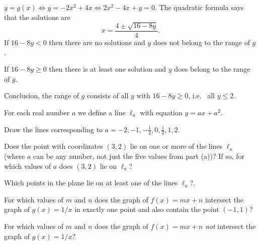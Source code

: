 \begin{multicols}{2}
$y = g(x) \iff y = -2x^2+4x \iff 2x^2-4x+y = 0$.
The quadratic formula says that the solutions are
\[
x= \frac{4\pm\sqrt{16-8y}} {4}.
\]
If $16-8y<0$ then there are no solutions and $y$ does
not belong to the range of $g$.

If $16-8y\geq0$ then there is at least one solution
and  $y$ does belong to the range of $g$.

Conclusion, the range of $g$ consists of all $y$ with
$16-8y\geq 0$, i.e.~ all $y\leq2$.
\endanswer

\problem \groupproblem For each real number $a$ we define a line
$\ell_a$ with equation $y=ax+a^2$.

\subprob Draw the lines corresponding to $a=-2, -1, -\frac12, 0,
\frac12, 1, 2$.

\subprob Does the point with coordinates $(3, 2)$ lie on one or more of
the lines $\ell_a$ (where $a$ can be any number, not just the five
values from part (a))?  If so, for which values of $a$ does $(3,2)$ lie on
$\ell_a$?

\subprob Which points in the plane lie on at least one of the lines
$\ell_a$?.


\problem For which values of $m$ and $n$ does the graph of $f(x) = mx+n$
intersect the graph of $g(x) = 1/x$ in exactly one point and also
contain the point $(-1,1)$?


\problem For which values of $m$ and $n$ does the graph of $f(x) = mx+n$
\emph{not} intersect the graph of $g(x) = 1/x$?

\end{multicols}
\noproblemfont
